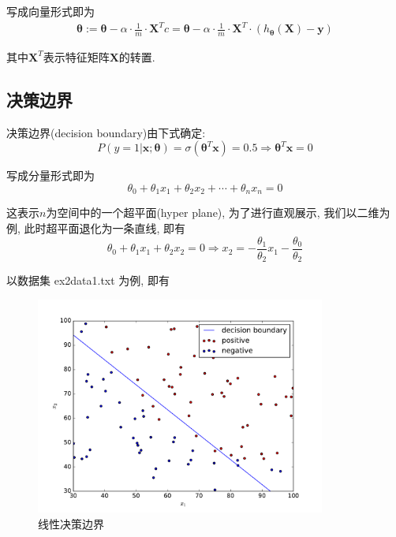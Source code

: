 \documentclass[a4paper,UTF8]{ctexart}
\theoremstyle{plain} \newtheorem{theorem}{定理}[section]
\theoremstyle{plain} \newtheorem{definition}{定义}[section]
\theoremstyle{plain} \newtheorem{lemma}{引理}[section]
\theoremstyle{plain} \newtheorem{proposition}{命题}[section]
\theoremstyle{plain} \newtheorem{example}{例}[section]
\theoremstyle{plain} \newtheorem{remark}{注}[section]
\theoremstyle{plain} \newtheorem{corollary}{推论}[section]
\begin{document}
写成向量形式即为
\begin{align*}
\bm{\theta} := \bm{\theta} - \alpha \cdot \frac{1}{m} \cdot \bm{X}^{T}c = \bm{\theta} - \alpha \cdot \frac{1}{m} \cdot \bm{X}^{T} \cdot (h_{\bm{\theta}}(\bm{X}) - \bm{y})
\end{align*}

其中$\bm{X}^{T}$表示特征矩阵$\bm{X}$的转置.



\subsection{决策边界}
决策边界(decision boundary)由下式确定:
\begin{equation*}
P(y = 1 | \bm{x}; \bm{\theta}) = \sigma(\bm{\theta}^{T} \bm{x}) = 0.5 \Rightarrow 
\bm{\theta}^{T} \bm{x} = 0
\end{equation*}

写成分量形式即为
\begin{equation*}
\theta_{0} + \theta_{1} x_{1} + \theta_{2} x_{2} + \cdots + \theta_{n} x_{n} = 0
\end{equation*}

这表示$n$为空间中的一个超平面(hyper plane), 为了进行直观展示, 我们以二维为例, 此时超平面退化为一条直线, 即有
\begin{equation*}
\theta_{0} + \theta_{1} x_{1} + \theta_{2} x_{2} = 0 \Rightarrow x_{2} = - \frac{\theta_{1}}{\theta_{2}} x_{1} - \frac{\theta_{0}}{\theta_{2}}
\end{equation*}

以数据集 ex2data1.txt 为例, 即有
\begin{figure}[!htb]
	\centering
	\includegraphics[width=0.85\textwidth]{ex2data1.pdf}
	\caption{线性决策边界}
\end{figure}
\end{document}
